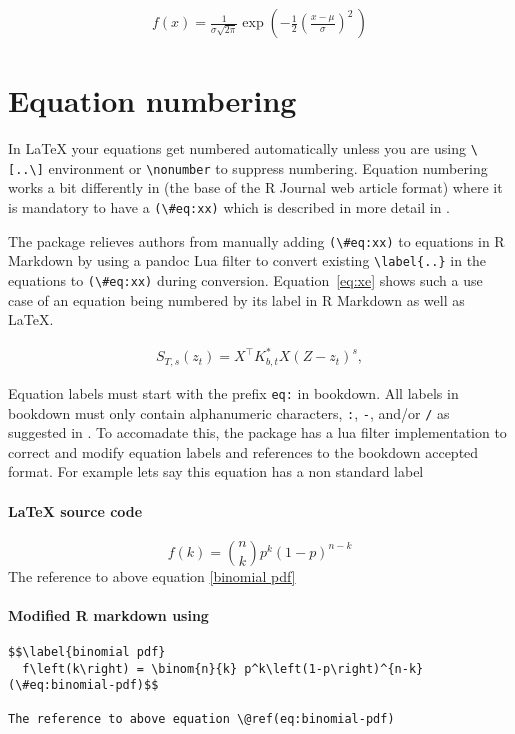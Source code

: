 \begin{align}
\label{eq:1}
f(x) = \frac{1}{\sigma\sqrt{2\pi}} 
  \exp\left( -\frac{1}{2}\left(\frac{x-\mu}{\sigma}\right)^{\!2}\,\right)
\end{align}

\section{Equation numbering}
In LaTeX your equations get numbered automatically unless you are using \verb|\[..\]| environment or \verb|\nonumber| to suppress
numbering. Equation numbering works a bit differently in  (the base of the R Journal web article format) where
it is mandatory to have a \verb|(\#eq:xx)| which is described in more detail in \citet{bookdown}.

The  package relieves authors from manually adding \verb|(\#eq:xx)| to equations in R Markdown
by using a pandoc Lua filter to convert existing \verb|\label{..}| in the equations to \verb|(\#eq:xx)|
during conversion. Equation~\ref{eq:xe} shows such a use case of an equation being numbered by its label in R Markdown
as well as LaTeX.

\begin{align}
S_{T, s}(z_t) = X^{\top} K_{b,t}^* X (Z - z_t)^s, 
\label{eq:xe}
\end{align}

Equation labels must start with the prefix \verb|eq:| in bookdown. All labels in bookdown must only contain alphanumeric characters, \verb|:|, \verb|-|, and/or \verb|/| as suggested in \citep{bookdown}. To accomadate this, the  package has a lua filter implementation to correct and modify equation labels and references to the
bookdown accepted format. For example lets say this equation has a non standard label
\paragraph{LaTeX source code}
\begin{example}
\begin{equation}\label{binomial pdf}
  f\left(k\right) = \binom{n}{k} p^k\left(1-p\right)^{n-k}

\end{equation}
The reference to above equation \eqref{binomial pdf}
\end{example}

\paragraph{Modified R markdown using }
\begin{verbatim}
$$\label{binomial pdf}
  f\left(k\right) = \binom{n}{k} p^k\left(1-p\right)^{n-k}   (\#eq:binomial-pdf)$$

The reference to above equation \@ref(eq:binomial-pdf)
\end{verbatim}

